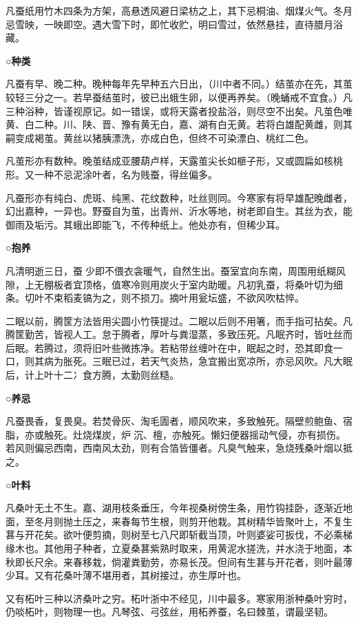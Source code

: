 \documentclass[]{article}
\begin{document}
凡蚕纸用竹木四条为方架，高悬透风避日梁枋之上，其下忌桐油、烟煤火气。冬月忌雪映，一映即空。遇大雪下时，即忙收贮，明曰雪过，依然悬挂，直待腊月浴藏。

\textbf{○种类}

凡蚕有早、晚二种。晚种每年先早种五六日出，（川中者不同。）结茧亦在先，其茧较轻三分之一。若早蚕结茧时，彼已出蛾生卵，以便再养矣。（晚蛹戒不宜食。）凡三种浴种，皆谨视原记。如一错误，或将天露者投盐浴，则尽空不出矣。凡茧色唯黄、白二种。川、陕、晋、豫有黄无白，嘉、湖有白无黄。若将白雄配黄雌，则其嗣变成褐茧。黄丝以猪胰漂洗，亦成白色，但终不可染漂白、桃红二色。

凡茧形亦有数种。晚茧结成亚腰葫卢样，天露茧尖长如榧子形，又或圆扁如核桃形。又一种不忌泥涂叶者，名为贱蚕，得丝偏多。

凡蚕形亦有纯白、虎斑、纯黑、花纹数种，吐丝则同。今寒家有将早雄配晚雌者，幻出嘉种，一异也。野蚕自为茧，出青州、沂水等地，树老即自生。其丝为衣，能御雨及垢污。其蛾出即能飞，不传种纸上。他处亦有，但稀少耳。

\textbf{○抱养}

凡清明逝三日，蚕少即不偎衣衾暖气，自然生出。蚕室宜向东南，周围用纸糊风隙，上无棚板者宜顶格，值寒冷则用炭火于室内助暖。凡初乳蚕，将桑叶切为细条。切叶不束稻麦镐为之，则不损刀。摘叶用瓮坛盛，不欲风吹枯悴。

二眠以前，腾筐方法皆用尖圆小竹筷提过。二眠以后则不用箸，而手指可拈矣。凡腾筐勤苦，皆视人工。怠于腾者，厚叶与粪湿蒸，多致压死。凡眠齐时，皆吐丝而后眠。若腾过，须将旧叶些微拣净。若粘带丝缠叶在中，眠起之时，恐其即食一口，则其病为胀死。三眠已过，若天气炎热，急宜搬出宽凉所，亦忌风吹。凡大眠后，计上叶十二冫食方腾，太勤则丝糙。

\textbf{○养忌}

凡蚕畏香，复畏臭。若焚骨灰、淘毛圊者，顺风吹来，多致触死。隔壁煎鲍鱼、宿脂，亦或触死。灶烧煤炭，炉沉、檀，亦触死。懒妇便器摇动气侵，亦有损伤。若风则偏忌西南，西南风太劲，则有合箔皆僵者。凡臭气触来，急烧残桑叶烟以抵之。

\textbf{○叶料}

凡桑叶无土不生。嘉、湖用枝条垂压，今年视桑树傍生条，用竹钩挂卧，逐渐近地面，至冬月则抛土压之，来春每节生根，则剪开他栽。其树精华皆聚叶上，不复生葚与开花矣。欲叶便剪摘，则树至七八尺即斩截当顶，叶则婆娑可扳伐，不必乘梯缘木也。其他用子种者，立夏桑葚紫熟时取来，用黄泥水搓洗，并水浇于地面，本秋即长尺余。来春移栽，倘灌粪勤劳，亦易长茂。但间有生葚与开花者，则叶最薄少耳。又有花桑叶薄不堪用者，其树接过，亦生厚叶也。

又有柘叶三种以济桑叶之穷。柘叶浙中不经见，川中最多。寒家用浙种桑叶穷时，仍啖柘叶，则物理一也。凡琴弦、弓弦丝，用柘养蚕，名曰棘茧，谓最坚韧。
\end{document}
